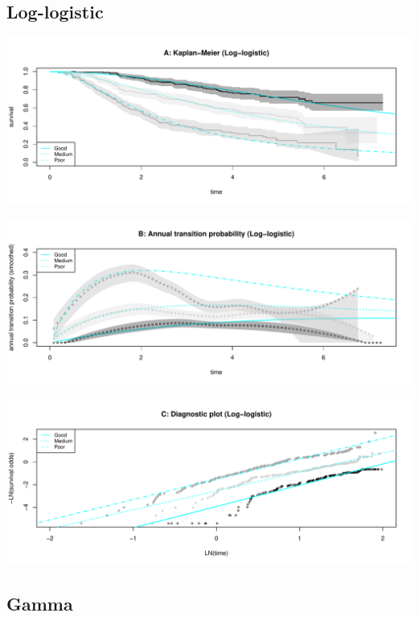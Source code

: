 \documentclass[]{article}
\begin{document}
\subsection{Log-logistic}\label{log-logistic}

\begin{flushleft}\includegraphics[height=0.3\textheight]{images/llog-1} \end{flushleft}

\begin{flushleft}\includegraphics[height=0.3\textheight]{images/llog-2} \end{flushleft}

\begin{flushleft}\includegraphics[height=0.3\textheight]{images/llog-3} \end{flushleft}

\subsection{Gamma}\label{gamma}
\end{document}
